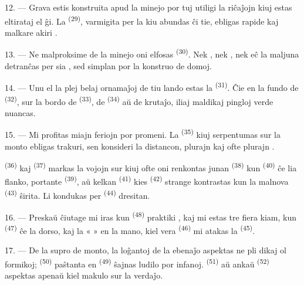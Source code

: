 12. --- Grava  estis konstruita apud la minejo por tuj
utiligi la riĉaĵojn kiuj estas eltirataj el ĝi. La 
\textsuperscript{(29)}, varmigita per la  kiu abundas ĉi tie,
ebligas rapide kaj malkare akiri .

13. --- Ne malproksime de la minejo oni elfosas 
\textsuperscript{(30)}. Nek , nek , nek eĉ
 la maljuna  detranĉas per sia
, sed simplan  por la konstruo de domoj.

14. --- Unu el la plej belaj ornamaĵoj de tiu lando estas la 
\textsuperscript{(31)}. Ĉie en la fundo de 
\textsuperscript{(32)}, sur la bordo de  \textsuperscript{(33)},
de  \textsuperscript{(34)} aŭ de krutaĵo, iliaj maldikaj pingloj
verde nuancas.

\VUsaut{3.0mm}
\VUsaut{3.0mm}

15. --- Mi profitas miajn feriojn por  promeni. La 
\textsuperscript{(35)} kiuj serpentumas sur la monto ebligas trakuri, sen
konsideri la distancon, plurajn  kaj ofte plurajn
.

 \textsuperscript{(36)} kaj 
\textsuperscript{(37)} markas la vojojn sur kiuj ofte oni renkontas junan
 \textsuperscript{(38)} kun 
\textsuperscript{(40)} ĉe lia flanko, portante 
\textsuperscript{(39)}, aŭ kelkan  \textsuperscript{(41)} kies
 \textsuperscript{(42)} strange kontrastas kun la malnova
 \textsuperscript{(43)} ŝirita. Li kondukas per  \textsuperscript{(44)} dresitan.

\VUsaut{3.0mm}

16. --- Preskaŭ ĉiutage mi iras kun  \textsuperscript{(48)}
praktiki , kaj mi estas tre fiera kiam, kun 
\textsuperscript{(47)} ĉe la dorso, kaj la «  » en la mano,
kiel vera  \textsuperscript{(46)} mi atakas la 
\textsuperscript{(45)}.

17. --- De la supro de monto, la loĝantoj de la ebenaĵo aspektas ne pli dikaj
ol formikoj;  \textsuperscript{(50)} paŝtanta en
 \textsuperscript{(49)} ŝajnas ludilo por infanoj.
 \textsuperscript{(51)} aŭ ankaŭ 
\textsuperscript{(52)} aspektas apenaŭ kiel makulo sur la verdaĵo.

